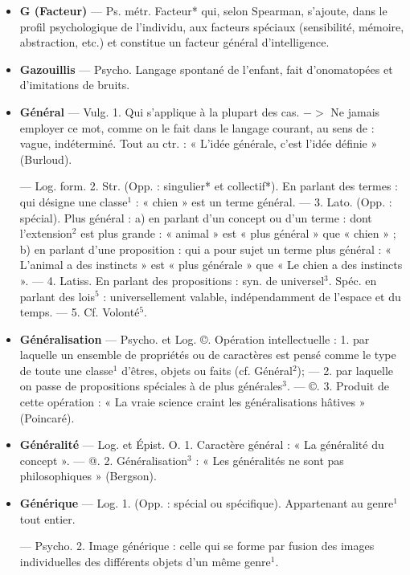 
	\begin{itemize}[leftmargin=1cm, label=, itemsep=1pt]
\item {\bf G (Facteur)} — Ps. métr. Facteur*
qui, selon Spearman, s'ajoute, dans
le profil psychologique de l'individu,
aux facteurs spéciaux (sensibilité,
mémoire, abstraction, etc.) et constitue un facteur général d’intelligence.

\item {\bf Gazouillis} — Psycho. Langage spontané de l'enfant, fait d’onomatopées
et d’imitations de bruits.

\item {\bf Général} — Vulg. 1. Qui s’applique
à la plupart des cas. $->$ Ne jamais
employer ce mot, comme on le fait
dans le langage courant, au sens
de : vague, indéterminé. Tout au ctr. :
« L'idée générale, c’est l’idée définie »
(Burloud).

— Log. form. 2. Str. (Opp. :
singulier* et collectif*). En parlant
des termes : qui désigne une classe$^1$ :
« chien » est un terme général. —
3. Lato. (Opp. : spécial). Plus général : a) en parlant d’un concept ou
d’un terme : dont l'extension$^2$ est
plus grande : « animal » est « plus
général » que « chien » ; b) en parlant d'une proposition : qui a pour
sujet un terme plus général : « L’animal a des instincts » est « plus générale » que « Le chien a des instincts ».
— 4. Latiss. En parlant des propositions : syn. de universel$^3$. Spéc. en
parlant des lois$^5$ : universellement
valable, indépendamment de l’espace
et du temps. — 5. Cf. Volonté$^5$.

\item {\bf Généralisation} — Psycho. et Log.
©. Opération intellectuelle : 1. par
laquelle un ensemble de propriétés
ou de caractères est pensé comme le
type de toute une classe$^1$ d'êtres,
objets ou faits (cf. Général$^2$); — 2.
par laquelle on passe de propositions spéciales à de plus générales$^3$.
— ©. 3. Produit de cette opération :
« La vraie science craint les généralisations hâtives » (Poincaré).

\item {\bf Généralité} — Log. et Épist. O. 1. Caractère général : « La généralité du
concept ». — @. 2. Généralisation$^3$ :
« Les généralités ne sont pas philosophiques » (Bergson).

\item {\bf Générique} — Log. 1. (Opp. : spécial
ou spécifique). Appartenant au
genre$^1$ tout entier.

— Psycho. 2. Image générique :
celle qui se forme par fusion des
images individuelles des différents
objets d’un même genre$^1$.


\end{itemize}
